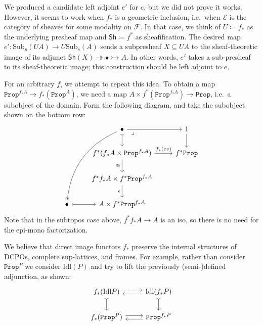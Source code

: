 \documentclass[11pt, oneside, article]{memoir}
\theoremstyle{plain}
\theoremstyle{definition}
\theoremstyle{remark}
\renewcommand{\ss}{\subseteq}
\newcommand{\const}[1]{\mathtt{#1}}
\newcommand{\Set}[1]{\mathrm{#1}}
\newcommand{\cat}[1]{\mathcal{#1}}
\newcommand{\Fun}[1]{\mathsf{#1}}
\newcommand{\surj}{\twoheadrightarrow}
\newcommand{\inj}{\rightarrowtail}
\newcommand{\Idl}{\Set{Idl}}
\newcommand{\Prop}{\const{Prop}}
\newcommand{\Sub}{\Set{Sub}}
\newcommand{\asSh}{\Fun{Sh}} %
\begin{document}
We produced a candidate left adjoint $e'$ for $e$, but we did not prove it works. However, it seems to work when $f_*$ is a geometric inclusion, i.e.\ when $\cat{E}$ is the category of sheaves for some modality on $\cat{F}$. In that case, we think of $U\coloneqq f_*$ as the underlying presheaf map and $\asSh\coloneqq f^*$ as sheafification. The desired map $e'\colon\Sub_p(UA)\to U\Sub_s(A)$ sends a subpresheaf $X\ss UA$ to the sheaf-theoretic image of its adjunct $\asSh(X)\surj\bullet\inj A$. In other words, $e'$ takes a sub-presheaf to its sheaf-theoretic image; this construction should be left adjoint to $e$.

For an arbitrary $f$, we attempt to repeat this idea. To obtain a map $\Prop^{f_*A}\to f_*(\Prop^A)$, we need a map $A\times f^*(\Prop^{f_*A})\to\Prop$, i.e.\ a subobject of the domain. Form the following diagram, and take the subobject shown on the bottom row:
\[
\begin{tikzcd}
	&\bullet\ar[r]\ar[d, tail]\ar[dr, phantom, very near start, "\lrcorner"]\ar[dddl, two heads, bend right]&1\ar[d]\\
	&f^*(f_*A\times\Prop^{f_*A})\ar[r, "f_*(ev)"]\ar[d, "\cong"']&f^*\Prop\\
	&f^*f_*A\times f^*\Prop^{f_*A}\ar[d, "\epsilon"']\\
	\bullet\ar[r, tail]&A\times f^*\Prop^{f_*A}
\end{tikzcd}
\]
Note that in the subtopos case above, $f^*f_*A\to A$ is an iso, so there is no need for the epi-mono factorization.

We believe that direct image functors $f_*$ preserve the internal structures of DCPOs, complete sup-lattices, and frames. For example, rather than consider $\Prop^P$ we consider $\Idl(P)$ and try to lift the previously (semi-)defined adjunction, as shown:
\[
\begin{tikzcd}
	f_*(\Idl P)\ar[r, shift left, dotted]\ar[d, tail]&\Idl(f_*P)\ar[l, shift left, dotted]\ar[d, tail]\\
	f_*(\Prop^P)\ar[r, shift left]&\Prop^{f_*P}\ar[l, shift left]
\end{tikzcd}
\]


\printbibliography
\end{document}
